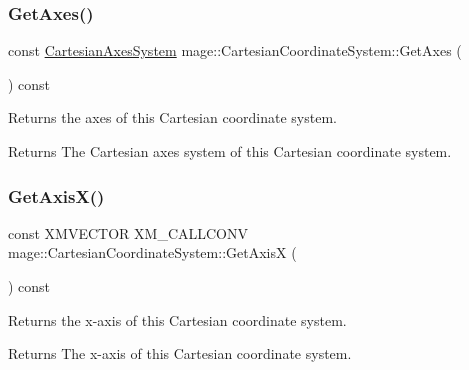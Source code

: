 \subsubsection{\texorpdfstring{Get\+Axes()}{GetAxes()}}
{\footnotesize\ttfamily const \hyperlink{structmage_1_1_cartesian_axes_system}{Cartesian\+Axes\+System} mage\+::\+Cartesian\+Coordinate\+System\+::\+Get\+Axes (\begin{DoxyParamCaption}{ }\end{DoxyParamCaption}) const\hspace{0.3cm}{\ttfamily [noexcept]}}

Returns the axes of this Cartesian coordinate system.

\begin{DoxyReturn}{Returns}
The Cartesian axes system of this Cartesian coordinate system. 
\end{DoxyReturn}
\hypertarget{structmage_1_1_cartesian_coordinate_system_a59f51cb1f4d0822c307038ed18e66b2a}{}\label{structmage_1_1_cartesian_coordinate_system_a59f51cb1f4d0822c307038ed18e66b2a} 
\subsubsection{\texorpdfstring{Get\+Axis\+X()}{GetAxisX()}}
{\footnotesize\ttfamily const X\+M\+V\+E\+C\+T\+OR X\+M\+\_\+\+C\+A\+L\+L\+C\+O\+NV mage\+::\+Cartesian\+Coordinate\+System\+::\+Get\+AxisX (\begin{DoxyParamCaption}{ }\end{DoxyParamCaption}) const\hspace{0.3cm}{\ttfamily [noexcept]}}

Returns the x-\/axis of this Cartesian coordinate system.

\begin{DoxyReturn}{Returns}
The x-\/axis of this Cartesian coordinate system. 
\end{DoxyReturn}
\hypertarget{structmage_1_1_cartesian_coordinate_system_a1d95be712ec657d1a39aca97d31c9195}{}\label{structmage_1_1_cartesian_coordinate_system_a1d95be712ec657d1a39aca97d31c9195} 
